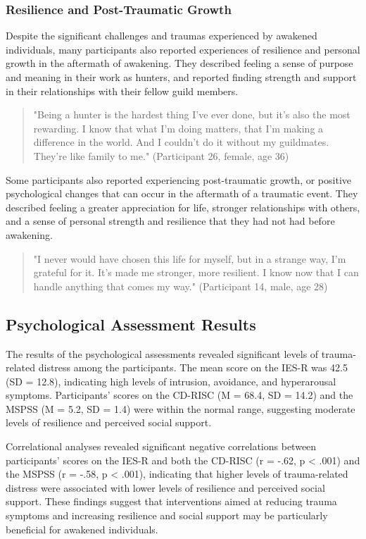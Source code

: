 \documentclass[12pt, a4paper]{article}
\begin{document}
\subsubsection{Resilience and Post-Traumatic Growth}
Despite the significant challenges and traumas experienced by awakened individuals, many participants also reported experiences of resilience and personal growth in the aftermath of awakening. They described feeling a sense of purpose and meaning in their work as hunters, and reported finding strength and support in their relationships with their fellow guild members.

\begin{quote}
    "Being a hunter is the hardest thing I've ever done, but it's also the most rewarding. I know that what I'm doing matters, that I'm making a difference in the world. And I couldn't do it without my guildmates. They're like family to me." (Participant 26, female, age 36)
\end{quote}

Some participants also reported experiencing post-traumatic growth, or positive psychological changes that can occur in the aftermath of a traumatic event. They described feeling a greater appreciation for life, stronger relationships with others, and a sense of personal strength and resilience that they had not had before awakening.

\begin{quote}
    "I never would have chosen this life for myself, but in a strange way, I'm grateful for it. It's made me stronger, more resilient. I know now that I can handle anything that comes my way." (Participant 14, male, age 28)
\end{quote}

\subsection{Psychological Assessment Results}
The results of the psychological assessments revealed significant levels of trauma-related distress among the participants. The mean score on the IES-R was 42.5 (SD = 12.8), indicating high levels of intrusion, avoidance, and hyperarousal symptoms. Participants' scores on the CD-RISC (M = 68.4, SD = 14.2) and the MSPSS (M = 5.2, SD = 1.4) were within the normal range, suggesting moderate levels of resilience and perceived social support.

Correlational analyses revealed significant negative correlations between participants' scores on the IES-R and both the CD-RISC (r = -.62, p < .001) and the MSPSS (r = -.58, p < .001), indicating that higher levels of trauma-related distress were associated with lower levels of resilience and perceived social support. These findings suggest that interventions aimed at reducing trauma symptoms and increasing resilience and social support may be particularly beneficial for awakened individuals.
\end{document}
